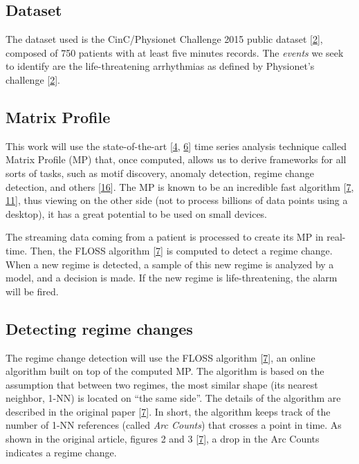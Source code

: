 \documentclass[runningheads]{llncs}
\begin{document}
\hypertarget{dataset}{%
\subsection{Dataset}\label{dataset}}

The dataset used is the CinC/Physionet Challenge 2015 public dataset {[}\protect\hyperlink{ref-Clifford2015}{2}{]}, composed of
750 patients with at least five minutes records. The \emph{events} we seek to identify are the
life-threatening arrhythmias as defined by Physionet's challenge {[}\protect\hyperlink{ref-Clifford2015}{2}{]}.

\hypertarget{matrix-profile}{%
\subsection{Matrix Profile}\label{matrix-profile}}

This work will use the state-of-the-art {[}\protect\hyperlink{ref-DePaepe2020}{4}, \protect\hyperlink{ref-Feremans2020}{6}{]} time series analysis technique
called Matrix Profile (MP) that, once computed, allows us to derive frameworks for all sorts of
tasks, such as motif discovery, anomaly detection, regime change detection, and others {[}\protect\hyperlink{ref-Yeh2017a}{16}{]}.
The MP is known to be an incredible fast algorithm {[}\protect\hyperlink{ref-gharghabi2018}{7}, \protect\hyperlink{ref-Madrid2019}{11}{]}, thus viewing on
the other side (not to process billions of data points using a desktop), it has a great potential to
be used on small devices.

The streaming data coming from a patient is processed to create its MP in real-time. Then, the
FLOSS algorithm {[}\protect\hyperlink{ref-gharghabi2018}{7}{]} is computed to detect a regime change. When a new regime is
detected, a sample of this new regime is analyzed by a model, and a decision is made. If the new
regime is life-threatening, the alarm will be fired.

\hypertarget{detecting-regime-changes}{%
\subsection{Detecting regime changes}\label{detecting-regime-changes}}

The regime change detection will use the FLOSS algorithm {[}\protect\hyperlink{ref-gharghabi2018}{7}{]}, an online algorithm built
on top of the computed MP. The algorithm is based on the assumption that between two regimes, the
most similar shape (its nearest neighbor, 1-NN) is located on ``the same side''. The details of the
algorithm are described in the original paper {[}\protect\hyperlink{ref-gharghabi2018}{7}{]}. In short, the algorithm keeps track
of the number of 1-NN references (called \emph{Arc Counts}) that crosses a point in time. As shown in
the original article, figures 2 and 3 {[}\protect\hyperlink{ref-gharghabi2018}{7}{]}, a drop in the Arc Counts indicates a regime
change.
\end{document}
